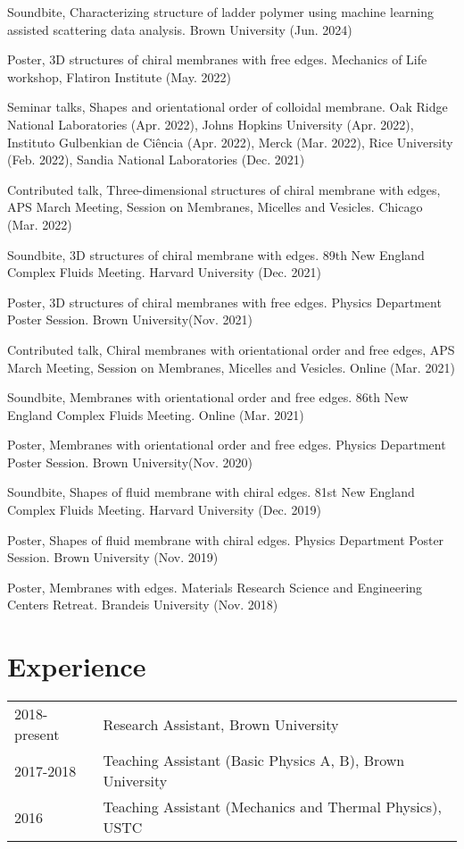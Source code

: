 \documentclass[11pt,letterpaper]{article}
\begin{document}
\begin{etaremune}
    \item Soundbite, Characterizing structure of ladder polymer using machine learning assisted scattering data analysis. Brown University (Jun. 2024)
    \item Poster, 3D structures of chiral membranes with free edges. Mechanics of Life workshop, Flatiron Institute (May. 2022)
    \item Seminar talks, Shapes and orientational order of colloidal membrane. Oak Ridge National Laboratories (Apr. 2022), Johns Hopkins University (Apr. 2022), Instituto Gulbenkian de Ciência (Apr. 2022), Merck (Mar. 2022), Rice University (Feb. 2022), Sandia National Laboratories (Dec. 2021)
    \item Contributed talk, Three-dimensional structures of chiral membrane with edges, APS March Meeting, Session on Membranes, Micelles and Vesicles. Chicago (Mar. 2022)
    \item Soundbite, 3D structures of chiral membrane with edges. 89th New England Complex Fluids Meeting. Harvard University (Dec. 2021)
    \item Poster, 3D structures of chiral membranes with free edges. Physics Department Poster Session. Brown University(Nov. 2021)
    \item Contributed talk, Chiral membranes with orientational order and free edges, APS March Meeting, Session on Membranes, Micelles and Vesicles. Online (Mar. 2021)
    \item Soundbite, Membranes with orientational order and free edges. 86th New England Complex Fluids Meeting. Online (Mar. 2021)
    \item Poster, Membranes with orientational order and free edges. Physics Department Poster Session. Brown University(Nov. 2020)
    \item Soundbite, Shapes of fluid membrane with chiral edges. 81st New England Complex Fluids Meeting. Harvard University (Dec. 2019)
    \item Poster, Shapes of fluid membrane with chiral edges. Physics Department Poster Session. Brown University (Nov. 2019)
    \item Poster, Membranes with edges. Materials Research Science and Engineering Centers Retreat. Brandeis University (Nov. 2018)
\end{etaremune}

\section*{Experience}
\vspace*{-0.15in}
\begin{longtable}{l p{\linewidth}}
    2018-present & Research Assistant, Brown University                      \\
    2017-2018    & Teaching Assistant (Basic Physics A, B), Brown University \\
    2016         & Teaching Assistant (Mechanics and Thermal Physics), USTC
\end{longtable}
\end{document}
